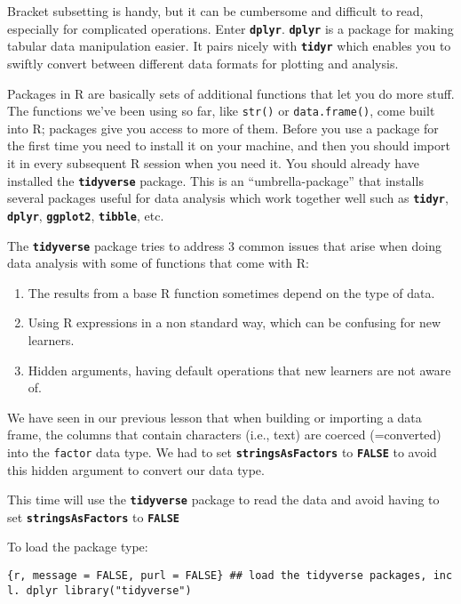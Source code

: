 \documentclass[]{article}
\providecommand{\tightlist}{%
  \setlength{\itemsep}{0pt}\setlength{\parskip}{0pt}}
\begin{document}
Bracket subsetting is handy, but it can be cumbersome and difficult to
read, especially for complicated operations. Enter
\textbf{\texttt{dplyr}}. \textbf{\texttt{dplyr}} is a package for making
tabular data manipulation easier. It pairs nicely with
\textbf{\texttt{tidyr}} which enables you to swiftly convert between
different data formats for plotting and analysis.

Packages in R are basically sets of additional functions that let you do
more stuff. The functions we've been using so far, like \texttt{str()}
or \texttt{data.frame()}, come built into R; packages give you access to
more of them. Before you use a package for the first time you need to
install it on your machine, and then you should import it in every
subsequent R session when you need it. You should already have installed
the \textbf{\texttt{tidyverse}} package. This is an ``umbrella-package''
that installs several packages useful for data analysis which work
together well such as \textbf{\texttt{tidyr}}, \textbf{\texttt{dplyr}},
\textbf{\texttt{ggplot2}}, \textbf{\texttt{tibble}}, etc.

The \textbf{\texttt{tidyverse}} package tries to address 3 common issues
that arise when doing data analysis with some of functions that come
with R:

\begin{enumerate}
\def\labelenumi{\arabic{enumi}.}
\tightlist
\item
  The results from a base R function sometimes depend on the type of
  data.
\item
  Using R expressions in a non standard way, which can be confusing for
  new learners.
\item
  Hidden arguments, having default operations that new learners are not
  aware of.
\end{enumerate}

We have seen in our previous lesson that when building or importing a
data frame, the columns that contain characters (i.e., text) are coerced
(=converted) into the \texttt{factor} data type. We had to set
\textbf{\texttt{stringsAsFactors}} to \textbf{\texttt{FALSE}} to avoid
this hidden argument to convert our data type.

This time will use the \textbf{\texttt{tidyverse}} package to read the
data and avoid having to set \textbf{\texttt{stringsAsFactors}} to
\textbf{\texttt{FALSE}}

To load the package type:

\texttt{\{r,\ message\ =\ FALSE,\ purl\ =\ FALSE\}\ \#\#\ load\ the\ tidyverse\ packages,\ incl.\ dplyr\ library("tidyverse")}
\end{document}
